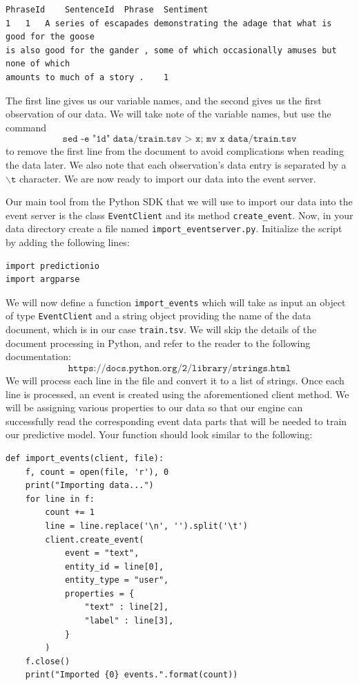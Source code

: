 \documentclass[a4paper,12pt]{article}
\renewcommand{\tt}[1]{\texttt{#1}}
\newcommand{\3}{\left}
\newcommand{\4}{\right}
\renewcommand{\-}[1]{{}^{-#1}}
\begin{document}
\begin{verbatim}
PhraseId	SentenceId	Phrase	Sentiment
1	1	A series of escapades demonstrating the adage that what is good for the goose 
is also good for the gander , some of which occasionally amuses but none of which 
amounts to much of a story .	1
\end{verbatim}

The first line gives us our variable names, and the second gives us the first observation of our data. We will take note of the variable names, but use the command 
$$
\tt{sed -e "1d" data/train.tsv > x; mv x data/train.tsv}
$$ 
to remove the first line from the document to avoid complications when reading the data later.  We also note that each observation's data entry is separated by a  $\backslash\tt{t}$ character. We are now ready to import our data into the event server. 

Our main tool from the Python SDK that we will use to import our data into the event server is the class \tt{EventClient} and its method \tt{create\_event}. Now, in your data directory create a file named \tt{import\_eventserver.py}. Initialize the script by adding the following lines:
\begin{verbatim}
import predictionio
import argparse
\end{verbatim}
We will now define a function \tt{import\_events} which will take as input an object of type \tt{EventClient} and a string object providing the name of the data document, which is in our case \tt{train.tsv}. We will skip the details of the document processing in Python, and refer to the reader to the following documentation:
$$
\tt{https://docs.python.org/2/library/strings.html}
$$
We will process each line in the file and convert it to a list of strings. Once each line is processed, an event is created using the aforementioned client method. We will be assigning various properties to our data so that our engine can successfully read the corresponding event data parts that will be needed to train our predictive model. Your function should look similar to the following:
\begin{verbatim}
def import_events(client, file):
    f, count = open(file, 'r'), 0
    print("Importing data...")
    for line in f:
        count += 1
        line = line.replace('\n', '').split('\t')
        client.create_event(
            event = "text",
            entity_id = line[0],
            entity_type = "user",
            properties = {
                "text" : line[2],
                "label" : line[3],
            }
        )
    f.close()
    print("Imported {0} events.".format(count))
\end{verbatim}
\end{document}
